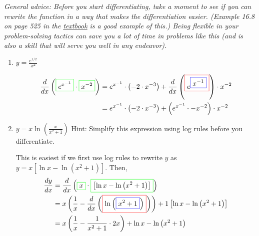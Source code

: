 \documentclass{article}
\makeatletter
\let\@href=\href
\renewcommand{\href}[2]{\@href{#1}{\ul{#2}}}
\makeatother
\begin{document}
\begin{enumerate}
  \emph{General advice: Before you start differentiating, take a moment to
    see if you can rewrite the function in a way that makes the
    differentiation easier.  (Example 16.8 on page 525 in the \href{https://canvas.harvard.edu/courses/138327/files/20608911?wrap=1}{textbook} is a good example
    of this.)  Being flexible in your problem-solving tactics can save you
    a lot of time in problems like this (and is also a skill that will
    serve you well in any endeavor).}

  \begin{enumerate}[topsep=0pt]
  \item
    \begin{problem}[\vfill\newpage]
      $y = \displaystyle \frac{e^{1/x}}{x^2}$
    \end{problem}

    \begin{solution}
      \begin{align*}
        \frac{d}{dx} \left(\fcolorbox{green}{white}{$\displaystyle  e^ { x^ { -1} } $}\cdot \fcolorbox{green}{white}{$\displaystyle  x^ { -2} $}\right) = {} & e^ { x^ { -1} } \cdot \left(-2\cdot x^ { -3} \right)+ \frac{d}{dx} \left(\fcolorbox{red}{white}{$\displaystyle e^ { \fcolorbox{blue}{white}{$\displaystyle x^ { -1} $}} $}\right)\cdot x^ { -2}  \\
        = {} & e^ { x^ { -1} } \cdot \left(-2\cdot x^ { -3} \right)+ \left(e^ { x^ { -1} } \cdot -x^ { -2} \right)\cdot x^ { -2} 
      \end{align*}
    \end{solution}
    
  \item %
    \begin{problem}[\vfill]
     $\displaystyle y = x\ln \left(\frac{x}{x^2+1}\right)$ Hint: Simplify this expression using log rules before you differentiate.
    \end{problem}

    \begin{solution}
      This is easiest if we first use log rules to rewrite $y$ as $y = x
      \left[ \ln x - \ln (x^2 + 1) \right]$.  Then,
      \begin{align*}
        \frac{dy}{dx} &= \frac{d}{dx}
        \left(\fcolorbox{green}{white}{$\displaystyle x$}\cdot
          \fcolorbox{green}{white}{$\displaystyle \left[\ln x-\ln\left(x^2
                + 1\right)\right]$}\right) \\
        &= x \left(\frac{1}{x}-\frac{d}{dx}
          \left(\fcolorbox{red}{white}{$\displaystyle
              \ln\left(\fcolorbox{blue}{white}{$\displaystyle x^ { 2} +
                  1$}\right)$}\right)\right)+ 1 \left[\ln x-\ln\left(x^ {
              2} + 1\right)\right] \\
        &= x \left(\frac{1}{x}-\frac{1}{x^ { 2} + 1}\cdot 2 x\right)+ \ln
        x-\ln\left(x^ { 2} + 1\right)
      \end{align*}
    \end{solution}


\end{enumerate}
\end{enumerate}
\end{document}
